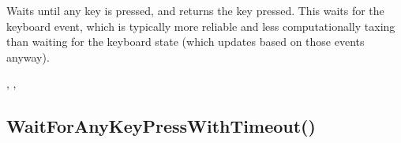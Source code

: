 \documentclass[letterpaper,10pt,english]{sphinxmanual}
\begin{document}
\sphinxAtStartPar
{}

\sphinxAtStartPar
Waits until any key is pressed, and returns the key pressed. This waits for the keyboard event, which is typically more reliable and less computationally taxing than waiting for the keyboard state (which updates based on those events anyway).

\sphinxAtStartPar
{}

\begin{sphinxVerbatim}[commandchars=\\\{\}]
\end{sphinxVerbatim}

\sphinxAtStartPar
{}

\begin{sphinxVerbatim}[commandchars=\\\{\}]
\end{sphinxVerbatim}

\sphinxAtStartPar
{}

\sphinxAtStartPar
{}, ,   

\ignorespaces 

\subsection{WaitForAnyKeyPressWithTimeout()}
\label{\detokenize{reference/peblenvironment:waitforanykeypresswithtimeout}}\label{\detokenize{reference/peblenvironment:index-74}}
\sphinxAtStartPar
{}
\end{document}
